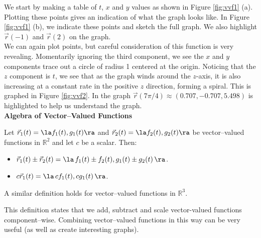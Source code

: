 {We start by making a table of $t$, $x$ and $y$ values as shown in Figure \ref{fig:vvf1} (a). Plotting these points gives an indication of what the graph looks like. In Figure \ref{fig:vvf1} (b), we indicate these points and sketch the full graph. We also highlight $\vec r(-1)$ and $\vec r(2)$ on the graph.
}\\

{We can again plot points, but careful consideration of this function is very revealing. Momentarily ignoring the third component, we see the $x$ and $y$ components trace out a circle of radius 1 centered at the origin. Noticing that the $z$ component is $t$, we see that as the graph winds around the $z$-axis, it is also increasing at a constant rate in the positive $z$ direction, forming a spiral. This is graphed in Figure \ref{fig:vvf2}. In the graph $\vec r(7\pi/4)\approx (0.707,-0.707,5.498) $ is highlighted to help us understand the graph.
}\\

\noindent\textbf{\large Algebra of Vector--Valued Functions}\\

{Let $\vec r_1(t)=\la f_1(t),g_1(t)\ra$ and $\vec r_2(t)=\la f_2(t),g_2(t)\ra$ be vector--valued functions in $\mathbb{R}^2$ and let $c$ be a scalar. Then:
\begin{itemize}
	\item $\vec r_1(t) \pm \vec r_2(t) = \la\, f_1(t)\pm f_2(t),g_1(t)\pm g_2(t)\,\ra$.
	\item	$c\vec r_1(t) = \la\, cf_1(t),cg_1(t)\,\ra$.
\end{itemize}
A similar definition holds for vector--valued functions in $\mathbb{R}^3$.
}
This definition states that we add, subtract and scale vector-valued functions component--wise. Combining vector--valued functions in this way can be very useful (as well as create interesting graphs).\\

